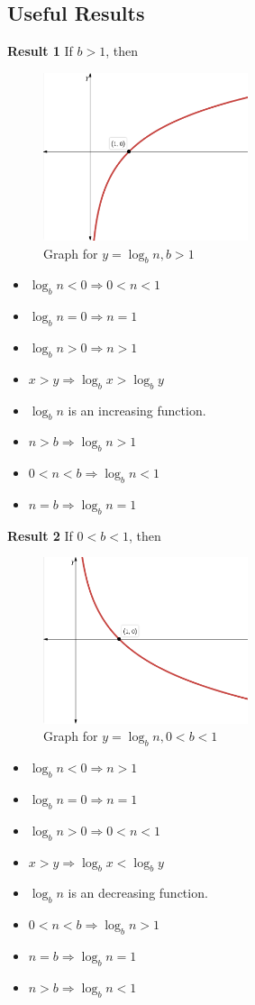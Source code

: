 \documentclass[11pt,a4paper,landscape]{article}
\begin{document}
\begin{multicols*}{3}
	\subsection{Useful Results}
	\textbf{Result 1} If $b>1$, then
	\begin{figure}[H]
		\centering
		\includegraphics[width=6cm]{final2.png}
		\caption{Graph for $y=\log_b n , b>1$}
	\end{figure}
	\begin{itemize}
		\item $\log_b n < 0 \Rightarrow 0<n<1$
		\item $\log_b n =0 \Rightarrow n=1$
		\item $\log_b n >0 \Rightarrow n>1$
		\item $x>y \Rightarrow \log_b x > \log_b y$
		\item $\log_b n$ is an increasing function.
		\item $n>b \Rightarrow \log_b n >1$
		\item $0<n<b \Rightarrow \log_b n <1$
		\item $n=b \Rightarrow \log_b n =1$
	\end{itemize}
	\textbf{Result 2} If $0<b<1$, then
	\begin{figure}[H]
		\centering
		\includegraphics[width=6cm]{final1.png}
		\caption{Graph for $y=\log_b n , 0<b<1$}
	\end{figure}
	\begin{itemize}
		\item $\log_b n <0 \Rightarrow n>1$
		\item $\log_b n =0 \Rightarrow n=1$
		\item $\log_b n >0 \Rightarrow 0<n<1$
		\item $x>y \Rightarrow \log_b x < \log_b y$
		\item $\log_b n$ is an decreasing function.
		\item $0<n<b \Rightarrow \log_b n >1$
		\item $n=b \Rightarrow \log_b n =1$
		\item $n>b \Rightarrow \log_b n <1$
	\end{itemize}

\end{multicols*}
\end{document}
